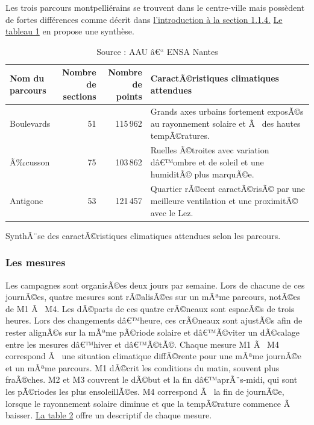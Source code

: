 \documentclass{article}
\begin{document}
Les trois parcours montpelliérains se trouvent dans le centre-ville mais possèdent de fortes différences comme décrit dans  \hyperref[sec:intro_parcours]{l'introduction à la section 1.1.4.} \hyperref[tab:parcours_sections]{Le tableau 1} en propose une synthèse.

\vspace{0.1cm}

\begin{table}[H]
\centering
\renewcommand{\arraystretch}{1.15}
\begin{tabularx}{\textwidth}{l r r X}
\toprule
\makecell{\textbf{Nom du } \\\textbf{parcours}} &
\makecell{\textbf{Nombre de }\\\textbf{sections}} &
\makecell{\textbf{Nombre de }\\\textbf{points}} &
\makecell{\textbf{CaractÃ©ristiques climatiques }\\\textbf{attendues}} \\

\midrule
Boulevards &
51 &
115\,962 &
Grands axes urbains fortement exposÃ©s au rayonnement solaire et Ã  des hautes tempÃ©ratures. \\
\addlinespace
Ã‰cusson &
75 &
103\,862 &
Ruelles Ã©troites avec variation dâ€™ombre et de soleil et une humiditÃ© plus marquÃ©e. \\
\addlinespace
Antigone &
53 &
121\,457 &
Quartier rÃ©cent caractÃ©risÃ© par une meilleure ventilation et une proximitÃ© avec le Lez. \\
\bottomrule
\end{tabularx}
\caption{SynthÃ¨se des caractÃ©ristiques climatiques attendues selon les parcours.}
\vspace{-0.45cm}
\caption*{\footnotesize Source : AAU â€“ ENSA Nantes}
\label{tab:parcours_sections}
\end{table}

\subsubsection{Les mesures}

Les campagnes sont organisÃ©es deux jours par semaine. Lors de chacune de ces journÃ©es, quatre mesures sont rÃ©alisÃ©es sur un mÃªme parcours, notÃ©es de M1 Ã  M4. Les dÃ©parts de ces quatre crÃ©neaux sont espacÃ©s de trois heures. Lors des changements dâ€™heure, ces crÃ©neaux sont ajustÃ©s afin de rester alignÃ©s sur la mÃªme pÃ©riode solaire et dâ€™Ã©viter un dÃ©calage entre les mesures dâ€™hiver et dâ€™Ã©tÃ©. Chaque mesure M1 Ã  M4 correspond Ã  une situation climatique diffÃ©rente pour une mÃªme journÃ©e et un mÃªme parcours. M1 dÃ©crit les conditions du matin, souvent plus fraÃ®ches. M2 et M3 couvrent le dÃ©but et la fin dâ€™aprÃ¨s-midi, qui sont les pÃ©riodes les plus ensoleillÃ©es. M4 correspond Ã  la fin de journÃ©e, lorsque le rayonnement solaire diminue et que la tempÃ©rature commence Ã  baisser. \hyperref[tab:mslot_horaires]{La table 2} offre un descriptif de chaque mesure.
\end{document}
